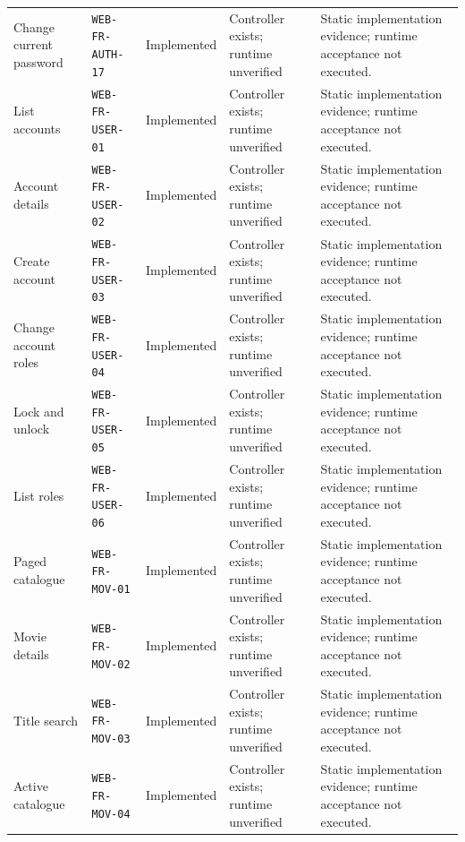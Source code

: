 \begin{longtable}{@{}P{0.19000\SRSWidth}P{0.18000\SRSWidth}P{0.15000\SRSWidth}P{0.20000\SRSWidth}P{0.28000\SRSWidth}@{}}
Change current password & \texttt{WEB-\allowbreak{}FR-\allowbreak{}AUTH-\allowbreak{}17} & Implemented & Controller exists; runtime unverified & Static implementation evidence; runtime acceptance not executed. \\[3pt]
List accounts & \texttt{WEB-\allowbreak{}FR-\allowbreak{}USER-\allowbreak{}01} & Implemented & Controller exists; runtime unverified & Static implementation evidence; runtime acceptance not executed. \\[3pt]
Account details & \texttt{WEB-\allowbreak{}FR-\allowbreak{}USER-\allowbreak{}02} & Implemented & Controller exists; runtime unverified & Static implementation evidence; runtime acceptance not executed. \\[3pt]
Create account & \texttt{WEB-\allowbreak{}FR-\allowbreak{}USER-\allowbreak{}03} & Implemented & Controller exists; runtime unverified & Static implementation evidence; runtime acceptance not executed. \\[3pt]
Change account roles & \texttt{WEB-\allowbreak{}FR-\allowbreak{}USER-\allowbreak{}04} & Implemented & Controller exists; runtime unverified & Static implementation evidence; runtime acceptance not executed. \\[3pt]
Lock and unlock & \texttt{WEB-\allowbreak{}FR-\allowbreak{}USER-\allowbreak{}05} & Implemented & Controller exists; runtime unverified & Static implementation evidence; runtime acceptance not executed. \\[3pt]
List roles & \texttt{WEB-\allowbreak{}FR-\allowbreak{}USER-\allowbreak{}06} & Implemented & Controller exists; runtime unverified & Static implementation evidence; runtime acceptance not executed. \\[3pt]
Paged catalogue & \texttt{WEB-\allowbreak{}FR-\allowbreak{}MOV-\allowbreak{}01} & Implemented & Controller exists; runtime unverified & Static implementation evidence; runtime acceptance not executed. \\[3pt]
Movie details & \texttt{WEB-\allowbreak{}FR-\allowbreak{}MOV-\allowbreak{}02} & Implemented & Controller exists; runtime unverified & Static implementation evidence; runtime acceptance not executed. \\[3pt]
Title search & \texttt{WEB-\allowbreak{}FR-\allowbreak{}MOV-\allowbreak{}03} & Implemented & Controller exists; runtime unverified & Static implementation evidence; runtime acceptance not executed. \\[3pt]
Active catalogue & \texttt{WEB-\allowbreak{}FR-\allowbreak{}MOV-\allowbreak{}04} & Implemented & Controller exists; runtime unverified & Static implementation evidence; runtime acceptance not executed. \\[3pt]

\end{longtable}
